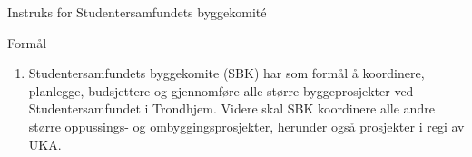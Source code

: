 
\begin{instruks}{Instruks for Studentersamfundets byggekomité}{}{}

    \begin{instruksledd}{Formål}
        \begin{enumerate}
            \item Studentersamfundets byggekomite (SBK) har som formål å koordinere, planlegge,
budsjettere og
                gjennomføre alle større byggeprosjekter ved Studentersamfundet i Trondhjem. Videre
skal SBK koordinere
                alle andre større oppussings- og ombyggingsprosjekter, herunder også prosjekter i
regi av UKA.
        \end{enumerate}
    \end{instruksledd}

\end{instruks}


